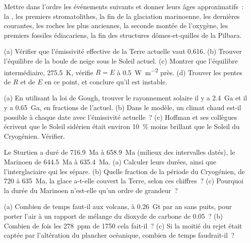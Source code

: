 \begin{exercise}[$\star$]\label{exo:b2:precambrian-earth:4}
Mettre dans l'ordre les événements suivants et donner leurs âges approximatifs~: la , les
premiers stromatolithes, la fin de la glaciation marinoenne, les dernières  courantes, les
roches les plus anciennes, la seconde montée de l'oxygène, les premiers fossiles édiacariens, la fin des
structures dômes-et-quilles de la Pilbara.
\end{exercise}

\begin{exercise}[$\star\star$]\label{exo:b2:precambrian-earth:5}
(a) Vérifier que l'émissivité effective de la Terre actuelle vaut 0.616. (b) Trouver l'équilibre de la boule de neige
sous le Soleil actuel. (c) Montrer que l'équilibre intermédiaire, \qty{275.5}{K}, vérifie
$R = E$ à \qty{0.5}{W.m^{-2}} près. (d) Trouver les pentes de $R$ et de $E$ en ce point, et conclure
qu'il est instable.
\end{exercise}

\begin{exercise}[$\star\star$]\label{exo:b2:precambrian-earth:6}
(a) En utilisant la loi de Gough, trouver le rayonnement solaire il y a \qty{2.4}{Ga} et il y a \qty{0.65}{Ga}, en fractions
de l'actuel. (b) Dans le modèle, un climat chaud est-il possible à chaque date avec l'émissivité actuelle~?
(c) Hoffman et ses collègues écrivent que le Soleil sidérien était environ \qty{10}{\percent} moins brillant que le
Soleil du Cryogénien. Vérifier.
\end{exercise}

\begin{exercise}[$\star\star$]\label{exo:b2:precambrian-earth:7}
Le Sturtien a duré de \qty{716.9}{Ma} à \qty{658.9}{Ma} (milieux des intervalles datés),
le Marinoen de \qty{644.5}{Ma} à \qty{635.4}{Ma}. (a) Calculer leurs durées, ainsi que
l'interglaciaire qui les sépare. (b) Quelle fraction de la période du Cryogénien, de 720 à \qty{635}{Ma},
la glace a-t-elle couvert la Terre, selon ces chiffres~? (c) Pourquoi la durée du Marinoen n'est-elle qu'un
ordre de grandeur~?
\end{exercise}

\begin{exercise}[$\star\star$]\label{exo:b2:precambrian-earth:8}
(a) Combien de temps faut-il aux volcans, à \qty{0.26}{Gt} par an sans puits, pour porter l'air à un
rapport de mélange du dioxyde de carbone de 0.05~? (b) Combien de fois les \qty{278}{ppm} de 1750 cela fait-il~? (c) Si la moitié
du rejet était captée par l'altération du plancher océanique, combien de temps faudrait-il~?
\end{exercise}

